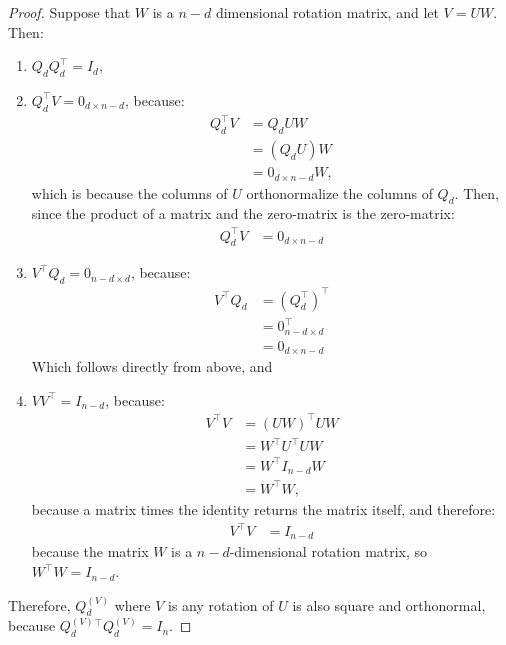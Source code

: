 \begin{proof}Suppose that $W$ is a $n - d$ dimensional rotation matrix, and let $V = UW$. Then:
\begin{enumerate}
    \item $Q_d Q_d^\top = I_d$,
    \item $Q_d^\top V = 0_{d \times n - d}$, because:
    \begin{align*}
        Q_d^\top V &= Q_d U W \\
        &= (Q_d U)W \\
        &= 0_{d \times n - d} W, 
    \end{align*}
    which is because the columns of $U$ orthonormalize the columns of $Q_d$. Then, since the product of a matrix and the zero-matrix is the zero-matrix:
    \begin{align*}
       Q_d^\top V &= 0_{d \times n - d}
    \end{align*}
    \item $V^\top Q_d = 0_{n - d \times d}$, because:
    \begin{align*}
        V^\top Q_d &= (Q_d^\top)^\top \\
        &= 0_{n - d \times d}^\top \\
        &= 0_{d \times n - d}
    \end{align*}
    Which follows directly from above, and
    \item $VV^\top = I_{n - d}$, because:
    \begin{align*}
        V^\top V &= \left(UW\right)^\top UW \\
        &= W^\top U^\top U W \\
        &= W^\top I_{n - d}W \\
        &= W^\top W,
    \end{align*}
    because a matrix times the identity returns the matrix itself, and therefore:
    \begin{align*}
        V^\top V &= I_{n - d}
    \end{align*}
    because the matrix $W$ is a $n - d$-dimensional rotation matrix, so $W^\top W = I_{n - d}$.
\end{enumerate}
Therefore, $Q_d^{(V)}$ where $V$ is any rotation of $U$ is also square and orthonormal, because $Q_d^{(V)}^\top Q_d^{(V)} = I_n$.
\end{proof}

